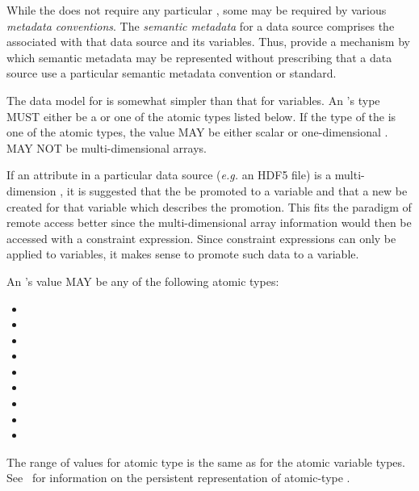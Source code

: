 \documentclass[justify]{nasa-ese}
\renewcommand{\new}[1]{\emph{#1}}
\begin{document}

While the \DAP does not require any particular \Attributes, some may be
required by various \new{metadata conventions}. The \new{semantic metadata}
for a data source comprises the \Attributes associated with that data source
and its variables\cite{cornillon03}.  Thus, \Attributes provide a
mechanism by which semantic 
metadata may be represented without prescribing that a data source use a
particular semantic metadata convention or standard.

The data model for \Attributes is somewhat simpler than that for variables.
An \Attribute's type MUST either be a \Structure or one of the
atomic types listed below. If the type of the \Attribute is one of the
atomic types, the value MAY be either scalar or one-dimensional
\Array.  \Attributes MAY NOT be multi-dimensional arrays.

If an attribute in a particular data source ({\it e.g.} an HDF5 file) is a
multi-dimension \Array, it is suggested that the \Attribute be promoted to a
variable and that a new \Attribute be created for that variable which
describes the promotion. This fits the paradigm of remote access better since
the multi-dimensional array information would then be accessed with a
constraint expression. Since constraint expressions can only be applied to
variables, it makes sense to promote such data to a variable.

An \Attribute's value MAY be any of the following atomic types:
\begin{itemize}
\item {}
\item {}
\item {}
\item {}
\item {}
\item {}
\item {}
\item {}
\item {}
\end{itemize}
 
The range of values for atomic type \Attributes is the same as for the atomic
variable types. See~ for information on the persistent
representation of atomic-type \Attributes.
\end{document}
